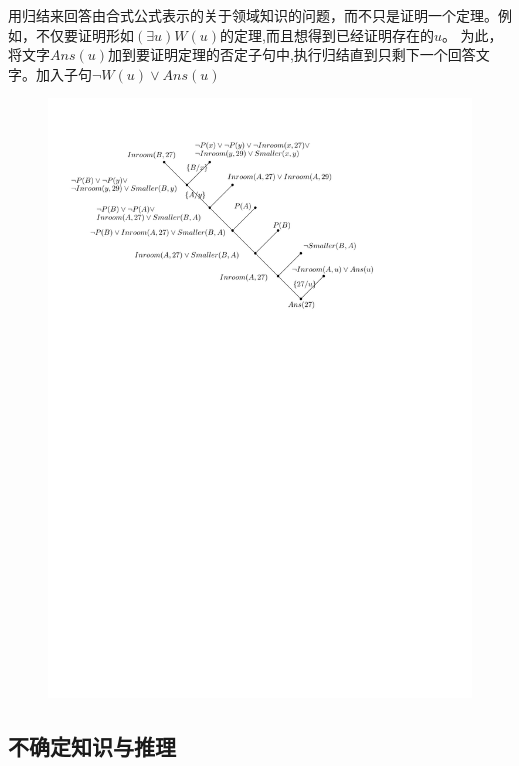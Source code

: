 \begin{example}
    用归结来回答由合式公式表示的关于领域知识的问题，而不只是证明一个定理。例如，不仅要证明形如$(\exists u)W(u)$的定理,而且想得到已经证明存在的$u$。
    为此，将文字$Ans(u)$加到要证明定理的否定子句中,执行归结直到只剩下一个回答文字。\textcolor{main1}{加入子句$\lnot W(u)\lor Ans(u)$}
    \begin{figure}[htbp]
        \centering
        \includegraphics[width = .7\textwidth]{image/问题求解例子+Ans.pdf}
    \end{figure}
\end{example}

\subsection{不确定知识与推理}
